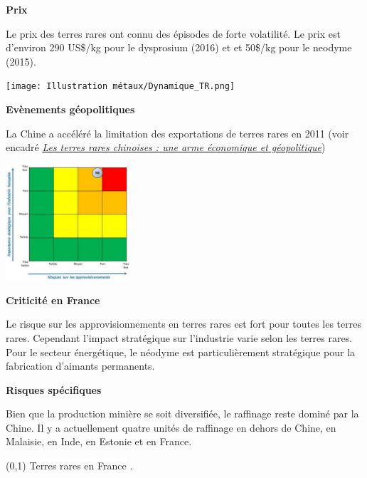 \begin{center}
    \textbf{Prix}
\end{center}
Le prix des terres rares ont connu des épisodes de forte volatilité.
Le prix est d'environ 290 US\$/kg pour le dysprosium (2016) et et 50\$/kg pour le neodyme (2015).
\clearpage
\begin{center}
    \texttt{[image: Illustration métaux/Dynamique\_TR.png]}
\end{center}
\begin{center}
    \textbf{Evènements géopolitiques}
\end{center}
La Chine a accéléré la limitation des exportations de terres rares en 2011 (voir encadré \hyperref[Chine]{\textit{Les terres rares chinoises : une arme  économique et géopolitique}})
\begin{multicols}{2}
    \includegraphics[width=0.35\textwidth]{Illustration métaux/TR_criticité.png}
    \begin{center}
    \textbf{Criticité en France}
    \end{center}
    Le risque sur les approvisionnements en terres rares est fort pour toutes les terres rares. Cependant l'impact stratégique sur l'industrie varie selon les terres rares. Pour le secteur énergétique, le néodyme est particulièrement stratégique pour la fabrication d'aimants permanents.
\end{multicols}
\begin{center}
    \textbf{Risques spécifiques}
\end{center}
Bien que la production minière se soit diversifiée, le raffinage reste dominé par la Chine. Il y a actuellement quatre unités de raffinage en dehors de Chine, en Malaisie, en Inde, en Estonie et en France.\\

\begin{center}
    \boxput*(0,1){
        \colorbox{white}{Terres rares en France}
    }{
    \setlength{\fboxsep}{15pt}
    .
    }
\end{center}

